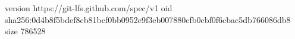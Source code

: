 version https://git-lfs.github.com/spec/v1
oid sha256:0d4b8f5bdef8cb81bcf0bb0952e9f3eb007880cfb0cbf0f6cbac5db766086db8
size 786528
